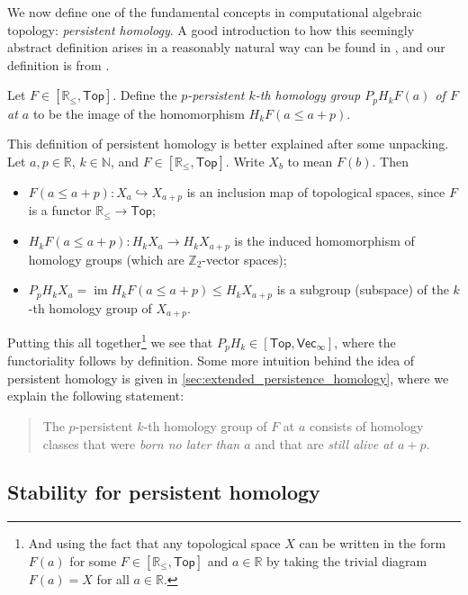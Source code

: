 \documentclass[12pt]{article}
\numberwithin{equation}{subsection}
\numberwithin{theorem}{subsection}
\numberwithin{lemma}{subsection}
\numberwithin{corollary}{subsection}
\numberwithin{definition}{subsection}
\numberwithin{example}{subsection}
\numberwithin{note}{subsection}
\newcommand{\zz}{\mathbb{Z}}
\newcommand{\rr}{\mathbb{R}}
\newcommand{\nn}{\mathbb{N}}
\DeclareMathOperator{\im}{im}
\newcommand{\rrleq}{\rr_\leqslant}
\newcommand{\Top}{\mathsf{Top}}
\begin{document}
        We now define one of the fundamental concepts in computational algebraic topology: \emph{persistent homology}.
        A good introduction to how this seemingly abstract definition arises in a reasonably natural way can be found in \cite[\S\S~5.13~\&~7.2]{ghrist2014elementary}, and our definition is from \cite[\S2.2.4]{Bubenik:dn}.

        \begin{definition}\label{df:persistent-homology}
            Let $F\in[\rrleq,\Top]$.
            Define the \emph{$p$-persistent $k$-th homology group $P_pH_kF(a)$ of $F$ at $a$} to be the image of the homomorphism $H_kF(a\leqslant a+p)$.
        \end{definition}

        This definition of persistent homology is better explained after some unpacking.
        Let $a,p\in\rr$, $k\in\nn$, and $F\in[\rrleq,\Top]$.
        Write $X_b$ to mean $F(b)$.
        Then
        \begin{itemize}
            \item $F(a\leqslant a+p)\colon X_a\hookrightarrow X_{a+p}$ is an inclusion map of topological spaces, since $F$ is a functor $\rrleq\to\Top$;
            \item $H_kF(a\leqslant a+p)\colon H_kX_a\to H_kX_{a+p}$ is the induced homomorphism of homology groups (which are $\zz_2$-vector spaces);
            \item $P_pH_kX_a=\im H_kF(a\leqslant a+p)\leqslant H_kX_{a+p}$ is a subgroup (subspace) of the $k$-th homology group of $X_{a+p}$.
        \end{itemize}
        Putting this all together\footnote{
            And using the fact that any topological space $X$ can be written in the form $F(a)$ for some $F\in[\rrleq,\Top]$ and $a\in\rr$ by taking the trivial diagram $F(a)=X$ for all $a\in\rr$.
        } we see that $P_pH_k\in[\Top,\mathsf{Vec}_\infty]$, where the functoriality follows by definition.
        Some more intuition behind the idea of persistent homology is given in \cref{sec:extended_persistence_homology}, where we explain the following statement:
        \begin{quotation}
            The $p$-persistent $k$-th homology group of $F$ at $a$ consists of homology classes that were \emph{born no later than $a$} and that are \emph{still alive at $a+p$}.
        \end{quotation}




        \subsection{Stability for persistent homology} %
        \label{sub:stability_for_persistent_homology}
\end{document}
